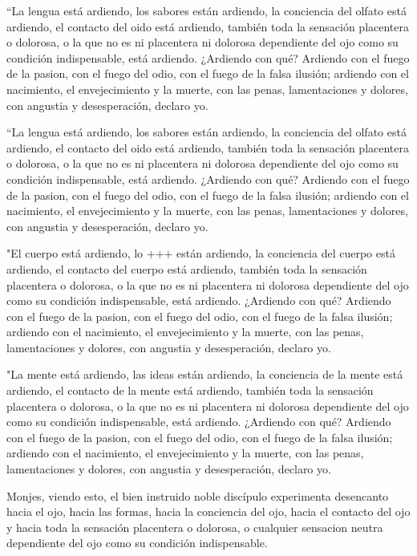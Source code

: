 “La lengua está ardiendo, los sabores están ardiendo, la conciencia del olfato está ardiendo, el contacto del oido está ardiendo, también toda la sensación placentera o dolorosa, o la que no es ni placentera ni dolorosa dependiente del ojo como su condición indispensable, está ardiendo. ¿Ardiendo con qué? Ardiendo con el fuego de la pasion, con el fuego del odio, con el fuego de la falsa ilusión; ardiendo con el nacimiento, el envejecimiento y la muerte, con las penas, lamentaciones y dolores, con angustia y desesperación, declaro yo.

“La lengua está ardiendo, los sabores están ardiendo, la conciencia del olfato está ardiendo, el contacto del oido está ardiendo, también toda la sensación placentera o dolorosa, o la que no es ni placentera ni dolorosa dependiente del ojo como su condición indispensable, está ardiendo. ¿Ardiendo con qué? Ardiendo con el fuego de la pasion, con el fuego del odio, con el fuego de la falsa ilusión; ardiendo con el nacimiento, el envejecimiento y la muerte, con las penas, lamentaciones y dolores, con angustia y desesperación, declaro yo.

"El cuerpo está ardiendo, lo +++ están ardiendo, la conciencia del cuerpo está ardiendo, el contacto del cuerpo está ardiendo, también toda la sensación placentera o dolorosa, o la que no es ni placentera ni dolorosa dependiente del ojo como su condición indispensable, está ardiendo. ¿Ardiendo con qué? Ardiendo con el fuego de la pasion, con el fuego del odio, con el fuego de la falsa ilusión; ardiendo con el nacimiento, el envejecimiento y la muerte, con las penas, lamentaciones y dolores, con angustia y desesperación, declaro yo.

"La mente está ardiendo, las ideas están ardiendo, la conciencia de la mente está ardiendo, el contacto de la mente está ardiendo, también toda la sensación placentera o dolorosa, o la que no es ni placentera ni dolorosa dependiente del ojo como su condición indispensable, está ardiendo. ¿Ardiendo con qué? Ardiendo con el fuego de la pasion, con el fuego del odio, con el fuego de la falsa ilusión; ardiendo con el nacimiento, el envejecimiento y la muerte, con las penas, lamentaciones y dolores, con angustia y desesperación, declaro yo.

Monjes, viendo esto, el bien instruido noble discípulo experimenta desencanto hacia el ojo, hacia las formas, hacia la conciencia del ojo, hacia el contacto del ojo y hacia toda la sensación placentera o dolorosa, o cualquier sensacion neutra dependiente del ojo como su condición indispensable. 



